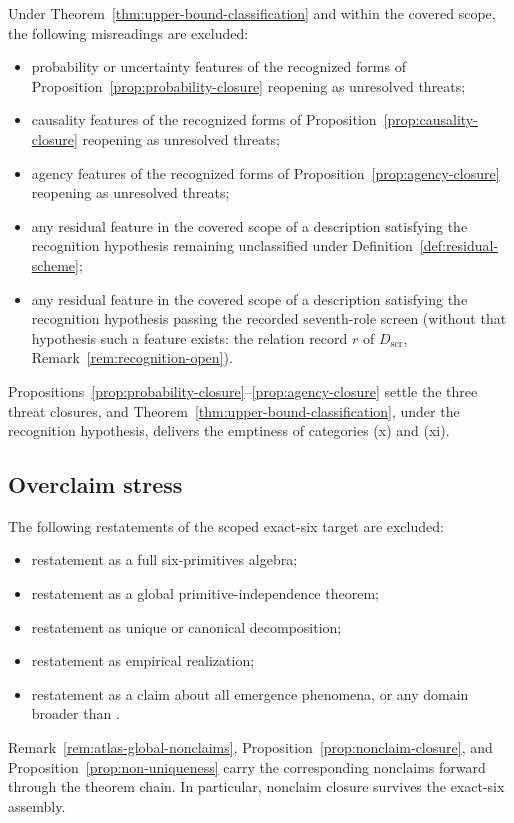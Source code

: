 \begin{remark}\label{prop:residual-stress}
Under Theorem~\ref{thm:upper-bound-classification} and within the covered
scope, the following misreadings are excluded:
\begin{itemize}[topsep=2pt,itemsep=1pt]
  \item probability or uncertainty features of the recognized forms of
    Proposition~\ref{prop:probability-closure} reopening as unresolved
    threats;
  \item causality features of the recognized forms of
    Proposition~\ref{prop:causality-closure} reopening as unresolved threats;
  \item agency features of the recognized forms of
    Proposition~\ref{prop:agency-closure} reopening as unresolved threats;
  \item any residual feature in the covered scope of a description satisfying the
    recognition hypothesis remaining unclassified under
    Definition~\ref{def:residual-scheme};
  \item any residual feature in the covered scope of a description satisfying
    the recognition hypothesis passing the recorded seventh-role screen
    (without that hypothesis such a feature exists: the relation record \(r\) of
    \(D_{\mathrm{scr}}\), Remark~\ref{rem:recognition-open}).
\end{itemize}
Propositions~\ref{prop:probability-closure}--\ref{prop:agency-closure}
settle the three threat closures, and
Theorem~\ref{thm:upper-bound-classification}, under the recognition
hypothesis, delivers the emptiness of categories (x) and (xi).
\end{remark}

\subsection{Overclaim stress}\label{subsec:overclaim-stress}

\begin{remark}\label{prop:overclaim-stress}
The following restatements of the scoped exact-six target are
excluded:
\begin{itemize}[topsep=2pt,itemsep=1pt]
  \item restatement as a full six-primitives algebra;
  \item restatement as a global primitive-independence theorem;
  \item restatement as unique or canonical decomposition;
  \item restatement as empirical realization;
  \item restatement as a claim about all emergence phenomena, or any
    domain broader than \FATCD{}.
\end{itemize}
Remark~\ref{rem:atlas-global-nonclaims},
Proposition~\ref{prop:nonclaim-closure}, and
Proposition~\ref{prop:non-uniqueness} carry the corresponding nonclaims
forward through the theorem chain. In particular, nonclaim closure
survives the exact-six assembly.
\end{remark}

